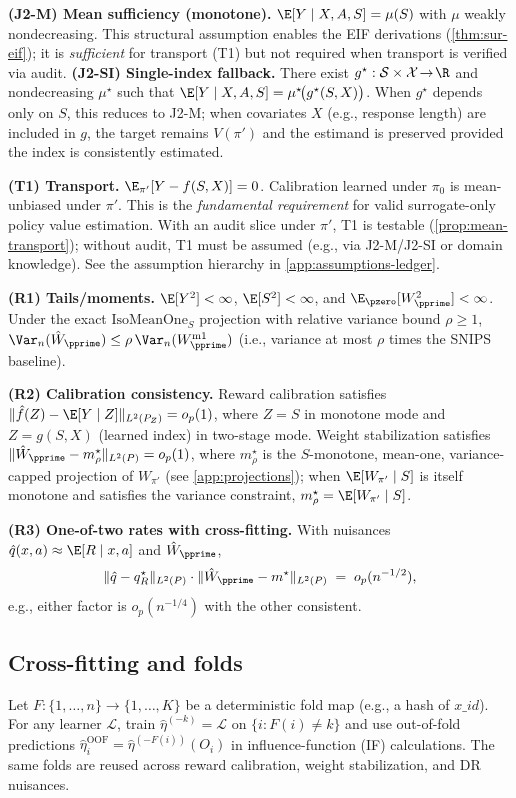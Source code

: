 \noindent\textbf{(J2-M) Mean sufficiency (monotone).} $\E[Y\mid X,A,S]=\mu(S)$ with $\mu$ weakly nondecreasing. This structural assumption enables the EIF derivations (\cref{thm:sur-eif}); it is \emph{sufficient} for transport (T1) but not required when transport is verified via audit.\quad
\textbf{(J2-SI) Single-index fallback.} There exist $g^\star:\mathcal{S}\times\mathcal{X}\!\to\!\R$ and nondecreasing $\mu^\star$ such that $\E[Y\mid X,A,S]=\mu^\star\!\big(g^\star(S,X)\big)$. When $g^\star$ depends only on $S$, this reduces to J2-M; when covariates $X$ (e.g., response length) are included in $g$, the target remains $V(\pi')$ and the estimand is preserved provided the index is consistently estimated.

\noindent\textbf{(T1) Transport.} $\E_{\pi'}[Y - f(S,X)] = 0$. Calibration learned under $\pi_0$ is mean-unbiased under $\pi'$. This is the \emph{fundamental requirement} for valid surrogate-only policy value estimation. With an audit slice under $\pi'$, T1 is testable (\cref{prop:mean-transport}); without audit, T1 must be assumed (e.g., via J2-M/J2-SI or domain knowledge). See the assumption hierarchy in \cref{app:assumptions-ledger}.

\noindent\textbf{(R1) Tails/moments.} $\E[Y^2]<\infty$, $\E[S^2]<\infty$, and $\E_{\pzero}[W_{\pprime}^2]<\infty$. Under the exact $\mathrm{IsoMeanOne}_S$ projection with relative variance bound $\rho\ge1$, $\Var_n(\hat W_{\pprime})\le \rho\,\Var_n(W^{\mathrm{m1}}_{\pprime})$ (i.e., variance at most $\rho$ times the SNIPS baseline).

\noindent\textbf{(R2) Calibration consistency.} Reward calibration satisfies $\|\hat f(Z)-\E[Y\mid Z]\|_{L^2(P_Z)}=o_p(1)$, where $Z=S$ in monotone mode and $Z=g(S,X)$ (learned index) in two-stage mode. Weight stabilization satisfies $\|\hat W_{\pprime}-m^\star_\rho\|_{L^2(P)}=o_p(1)$, where $m^\star_\rho$ is the $S$-monotone, mean-one, variance-capped projection of $W_{\pi'}$ (see \cref{app:projections}); when $\E[W_{\pi'}\mid S]$ is itself monotone and satisfies the variance constraint, $m^\star_\rho=\E[W_{\pi'}\mid S]$.

\noindent\textbf{(R3) One-of-two rates with cross-fitting.} With nuisances $\hat q(x,a)\approx \E[R\mid x,a]$ and $\hat W_{\pprime}$,
\[
\|\hat q-q^\star_R\|_{L^2(P)}\cdot \|\hat W_{\pprime}-m^\star\|_{L^2(P)} \;=\; o_p(n^{-1/2}),
\]
e.g., either factor is $o_p(n^{-1/4})$ with the other consistent.

\subsection{Cross-fitting and folds}
\label{app:folds}
Let $F:\{1,\dots,n\}\!\to\!\{1,\dots,K\}$ be a deterministic fold map (e.g., a hash of $x\_id$). For any learner $\mathcal{L}$,
train $\hat\eta^{(-k)}=\mathcal{L}$ on $\{i:F(i)\neq k\}$ and use out-of-fold predictions
$\hat\eta^{\mathrm{OOF}}_i=\hat\eta^{(-F(i))}(O_i)$ in influence-function (IF) calculations. The same folds are reused across reward calibration, weight stabilization, and DR nuisances.

